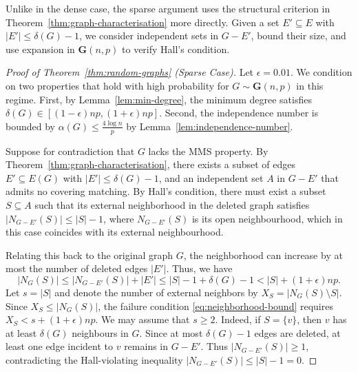 \documentclass[12pt,UKenglish]{amsart}
\theoremstyle{plain}
\theoremstyle{definition}
\theoremstyle{remark}
\begin{document}
Unlike in the dense case, the sparse argument uses the structural criterion in Theorem~\ref{thm:graph-characterisation} more directly. Given a set $E'\subseteq E$ with $|E'|\leq\delta(G)-1$, we consider independent sets in $G-E'$, bound their size, and use expansion in $\mathbf{G}(n,p)$ to verify Hall's condition.
\begin{proof}[Proof of Theorem~\ref{thm:random-graphs} (Sparse Case)]
Let $\epsilon = 0.01$. We condition on two properties that hold with high probability for $G \sim \mathbf{G}(n,p)$ in this regime. First, by Lemma~\ref{lem:min-degree}, the minimum degree satisfies $\delta(G) \in [(1-\epsilon)np, (1+\epsilon)np]$. Second, the independence number is bounded by $\alpha(G) \le \frac{4 \log n}{p}$ by Lemma~\ref{lem:independence-number}.

Suppose for contradiction that $G$ lacks the MMS property. By Theorem~\ref{thm:graph-characterisation}, there exists a subset of edges $E' \subseteq E(G)$ with $|E'| \le \delta(G) - 1$, and an independent set $A$ in $G - E'$ that admits no covering matching. By Hall's condition, there must exist a subset $S \subseteq A$ such that its external neighborhood in the deleted graph satisfies $|N_{G-E'}(S)| \le |S| - 1$, where $N_{G-E'}(S)$ is its open neighbourhood, which in this case coincides with its external neighbourhood.

Relating this back to the original graph $G$, the neighborhood can increase by at most the number of deleted edges $|E'|$. Thus, we have
\begin{equation}
  |N_G(S)| \le |N_{G-E'}(S)| + |E'| \le |S| - 1 + \delta(G) - 1 < |S| + (1+\epsilon)np. \label{eq:neighborhood-bound}
\end{equation}
Let $s = |S|$ and denote the number of external neighbors by $X_S = |N_G(S) \setminus S|$. Since $X_S \le |N_G(S)|$, the failure condition \eqref{eq:neighborhood-bound} requires $X_S < s + (1+\epsilon)np$. We may assume that $s\ge 2$. Indeed, if $S=\{v\}$, then $v$ has at least $\delta(G)$ neighbours in $G$. Since at most $\delta(G)-1$ edges are deleted, at least one edge incident to $v$ remains in $G-E'$. Thus $|N_{G-E'}(S)|\ge 1$, contradicting the Hall-violating inequality $|N_{G-E'}(S)|\le |S|-1=0$.


\end{proof}
\end{document}
